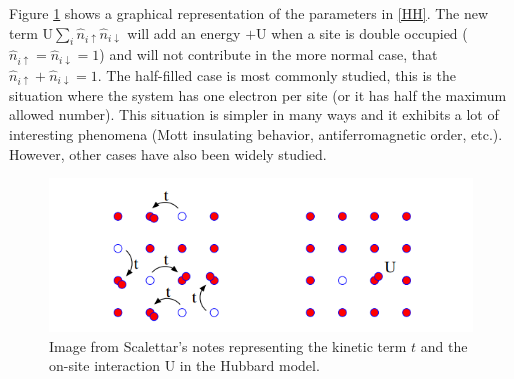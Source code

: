  Figure \ref{fig:Hubbard} shows a graphical representation of the parameters in \ref{HH}. The new term $\text{U}\sum_i \hat{n}_{i\uparrow}\hat{n}_{i\downarrow}$ will add an energy $+\text{U}$ when a site is double occupied ($\hat{n}_{i\uparrow} = \hat{n}_{i\downarrow} = 1$) and will not contribute in the more normal case, that $\hat{n}_{i\uparrow} + \hat{n}_{i\downarrow} = 1$. The half-filled case is most commonly studied, this is the situation where the system has one electron per site (or it has half the maximum allowed number). This situation is simpler in many ways and it exhibits a lot of interesting phenomena (Mott insulating behavior, antiferromagnetic order, etc.). However, other cases have also been widely studied.

\begin{figure}
\centering
  \includegraphics[width=\linewidth]{../Figures/hubbard.png}
  \caption{Image from Scalettar's notes representing the kinetic term $t$ and the on-site interaction $\text{U}$ in the Hubbard model.} 
\label{fig:Hubbard}
\end{figure}

